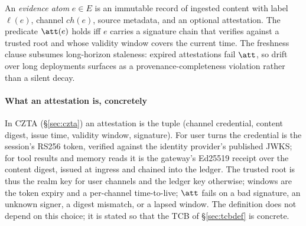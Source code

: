 \begin{definition}
\label{def:evidence}
An \emph{evidence atom} $e \in E$ is an immutable record of ingested
content with label $\ell(e)$, channel $\mathit{ch}(e)$, source metadata,
and an optional attestation. The predicate $\att(e)$ holds iff $e$
carries a signature chain that verifies against a trusted root and
whose validity window covers the current time. The freshness clause
subsumes long-horizon staleness: expired attestations fail $\att$, so
drift over long deployments surfaces as a provenance-completeness
violation rather than a silent decay.
\end{definition}

\paragraph*{What an attestation is, concretely}
In CZTA (\S\ref{sec:czta}) an attestation is the tuple (channel
credential, content digest, issue time, validity window, signature).
For user turns the credential is the session's RS256 token, verified
against the identity provider's published JWKS; for tool results and
memory reads it is the gateway's Ed25519 receipt over the content
digest, issued at ingress and chained into the ledger. The trusted root
is thus the realm key for user channels and the ledger key otherwise;
windows are the token expiry and a per-channel time-to-live; $\att$
fails on a bad signature, an unknown signer, a digest mismatch, or a
lapsed window. The definition does not depend on this choice; it is
stated so that the TCB of \S\ref{sec:tcbdef} is concrete.

